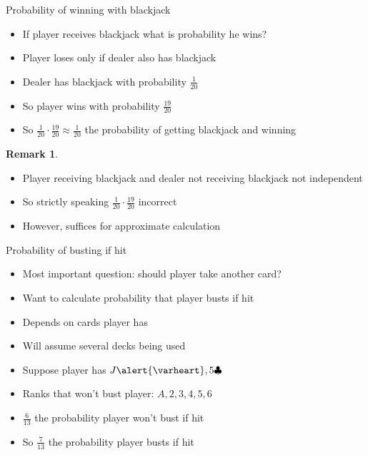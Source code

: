 \documentclass[handout]{beamer}
\theoremstyle{definition}
\newtheorem{remark}{Remark}
\newcommand{\hs}{\alert{\varheart}}
\newcommand{\cs}{\clubsuit}
\begin{document}
\begin{frame}{Probability of winning with blackjack}
\begin{itemize}
\item If player receives blackjack
what is probability he wins?
\item Player loses only if dealer also has blackjack
\item Dealer has blackjack with probability $\textstyle\frac{1}{20}$
\item So player wins with probability $\textstyle\frac{19}{20}$
\item So $\frac{1}{20}\cdot\frac{19}{20}
\approx\frac{1}{20}$ the probability of getting blackjack and winning
\end{itemize}
\begin{remark}
\begin{itemize}
\item Player receiving blackjack and dealer not receiving blackjack
not independent
\item So strictly speaking 
$\frac{1}{20}\cdot\frac{19}{20}$ incorrect
\item However, suffices for approximate calculation
\end{itemize}
\end{remark}
\end{frame}

\begin{frame}{Probability of busting if hit}
\begin{itemize}
\item Most important question: should player take another card?
\item Want to calculate probability that player busts
if hit
\item Depends on cards player has
\item Will assume several decks being used
\end{itemize}
\begin{example}
\begin{itemize}
\item Suppose player has $J\hs,5\cs$
\item Ranks that \alert{won't} bust player:
$A,2,3,4,5,6$
\item $\frac{6}{13}$ the probability player won't bust if hit
\item So $\frac{7}{13}$ the probability player busts if hit
\end{itemize}
\end{example}
\end{frame}
\end{document}

